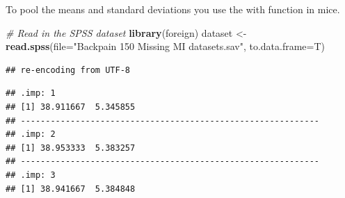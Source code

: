 \documentclass[
]{book}
\newenvironment{Shaded}{\begin{snugshade}}{\end{snugshade}}
\newcommand{\CommentTok}[1]{\textcolor[rgb]{0.56,0.35,0.01}{\textit{#1}}}
\newcommand{\ControlFlowTok}[1]{\textcolor[rgb]{0.13,0.29,0.53}{\textbf{#1}}}
\newcommand{\DataTypeTok}[1]{\textcolor[rgb]{0.13,0.29,0.53}{#1}}
\newcommand{\DecValTok}[1]{\textcolor[rgb]{0.00,0.00,0.81}{#1}}
\newcommand{\KeywordTok}[1]{\textcolor[rgb]{0.13,0.29,0.53}{\textbf{#1}}}
\newcommand{\NormalTok}[1]{#1}
\newcommand{\OperatorTok}[1]{\textcolor[rgb]{0.81,0.36,0.00}{\textbf{#1}}}
\newcommand{\OtherTok}[1]{\textcolor[rgb]{0.56,0.35,0.01}{#1}}
\newcommand{\StringTok}[1]{\textcolor[rgb]{0.31,0.60,0.02}{#1}}
\begin{document}
To pool the means and standard deviations you use the with function in
mice.

\begin{Shaded}
\begin{Highlighting}[]
\CommentTok{# Read in the SPSS dataset}
\KeywordTok{library}\NormalTok{(foreign)}
\NormalTok{dataset <-}\StringTok{ }\KeywordTok{read.spss}\NormalTok{(}\DataTypeTok{file=}\StringTok{"Backpain 150 Missing MI datasets.sav"}\NormalTok{, }\DataTypeTok{to.data.frame=}\NormalTok{T)}
\end{Highlighting}
\end{Shaded}

\begin{verbatim}
## re-encoding from UTF-8
\end{verbatim}

\begin{Shaded}
\end{Shaded}

\begin{verbatim}
## .imp: 1
## [1] 38.911667  5.345855
## ------------------------------------------------------------ 
## .imp: 2
## [1] 38.953333  5.383257
## ------------------------------------------------------------ 
## .imp: 3
## [1] 38.941667  5.384848
\end{verbatim}
\end{document}
